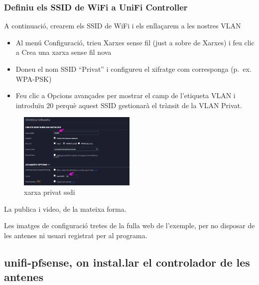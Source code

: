\documentclass[
  10pt,
]{krantz}
\providecommand{\tightlist}{%
  \setlength{\itemsep}{0pt}\setlength{\parskip}{0pt}}
\begin{document}
\hypertarget{definiu-els-ssid-de-wifi-a-unifi-controller}{%
\subsubsection{Definiu els SSID de WiFi a UniFi Controller}\label{definiu-els-ssid-de-wifi-a-unifi-controller}}

A continuació, crearem els SSID de WiFi i els enllaçarem a les nostres VLAN

\begin{itemize}
\tightlist
\item
  Al menú Configuració, trieu Xarxes sense fil (just a sobre de Xarxes) i feu clic a Crea una xarxa sense fil nova
\item
  Doneu el nom SSID ``Privat'' i configureu el xifratge com corresponga (p.~ex. WPA-PSK)
\item
  Feu clic a Opcions avançades per mostrar el camp de l'etiqueta VLAN i introduïu 20 perquè aquest SSID gestionarà el trànsit de la VLAN Privat.
\end{itemize}

\begin{figure}
\centering
\includegraphics[width=0.5\textwidth,height=\textheight]{imatges/wifi/unifi_04_privat_ssid.png}
\caption{xarxa privat ssdi}
\end{figure}

La publica i video, de la mateixa forma.

\begin{rmdinfo}{}
Les imatges de configuració tretes de la fulla web de l'exemple, per no disposar de les antenes ni usuari registrat per al programa.

\end{rmdinfo}

\hypertarget{unifi-pfsense-on-instal.lar-el-controlador-de-les-antenes}{%
\subsection{unifi-pfsense, on instal.lar el controlador de les antenes}\label{unifi-pfsense-on-instal.lar-el-controlador-de-les-antenes}}
\end{document}
